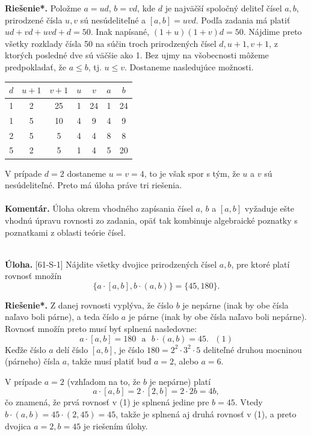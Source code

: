 \documentclass[11pt,a4paper,oneside,final]{book}
\newcommand{\kom}{\textbf{Komentár.} }
\newcommand{\ul}{\textbf{Úloha.} }
\newcommand{\rieh}{\textbf{Riešenie*.} }
\begin{document}
\rieh Položme $a = ud$, $b = vd$, kde $d$ je najväčší spoločný deliteľ čísel $a, b$, prirodzené čísla $u, v$ sú nesúdeliteľné a $[a,b]=uvd$. Podľa zadania má platiť $ud+vd+uvd+d= 50$. Inak napísané, $(1 + u)(1 + v)d = 50$. Nájdime preto všetky rozklady čísla 50 na súčin troch prirodzených čísel $d, u+1, v+1$, z ktorých posledné dve sú väčšie ako 1. Bez ujmy na všobecnosti môžeme predpokladať, že $a \leq b$, tj. $u \leq v$. Dostaneme nasledujúce možnosti.
\begin{center}
\begin{tabular}{|c|c|c|c|c|c|c|}
\hline
$d$ & $u+1$ & $v+1$ & $u$ & $v$ & $a$ & $b$\\
\hline
1 & 2 & 25 & 1 & 24 & 1 & 24 \\
1 & 5 & 10 & 4 & 9 & 4 & 9\\
2 & 5 & 5 & 4 & 4 & 8 & 8 \\
5 & 2 & 5 & 1 & 4 & 5 & 20\\
\hline
\end{tabular}
\end{center}
V prípade $d=2$ dostaneme $u=v=4$, to je však spor s tým, že $u$ a $v$ sú nesúdeliteľné. Preto má úloha práve tri riešenia. \\
\\
\kom Úloha okrem vhodného zapísania čísel $a$, $b$ a $[a,b]$ vyžaduje ešte vhodnú úpravu rovnosti zo zadania, opäť tak kombinuje algebraické poznatky s poznatkami z oblasti teórie čísel.\\
\\
\begin{tcolorbox}[breakable,notitle,boxrule=0pt,colback=light-gray,colframe=light-gray]\ul [61-S-1]
Nájdite všetky dvojice prirodzených čísel $a, b$, pre ktoré platí rovnosť množín
$$\{a \cdot [a, b], b \cdot (a, b)\} = \{45, 180\}.$$

\end{tcolorbox}

\rieh Z danej rovnosti vyplýva, že číslo $b$ je nepárne (inak by obe čísla naľavo boli párne), a teda číslo $a$ je párne (inak by obe čísla naľavo boli nepárne). Rovnosť množín preto musí byť splnená nasledovne:
$$a \cdot [a, b] = 180 \ \ \ \text{a} \ \ \  b \cdot (a, b) = 45. \ \ \ (1)$$
Keďže číslo $a$ delí číslo $[a, b]$, je číslo $180 = 2^2 \cdot3^2 \cdot 5$ deliteľné druhou mocninou (párneho) čísla $a$, takže musí platiť buď $a = 2$, alebo $a = 6$.

V prípade $a = 2$ (vzhľadom na to, že $b$ je nepárne) platí
$$a \cdot [a, b] = 2 \cdot [2, b] = 2 \cdot 2b = 4b,$$
čo znamená, že prvá rovnosť v (1) je splnená jedine pre $b = 45$. Vtedy $b \cdot (a, b) = 45 \cdot (2, 45) = 45$, takže je splnená aj druhá rovnosť v (1), a preto dvojica $a = 2, b = 45$ je riešením úlohy.
\end{document}
